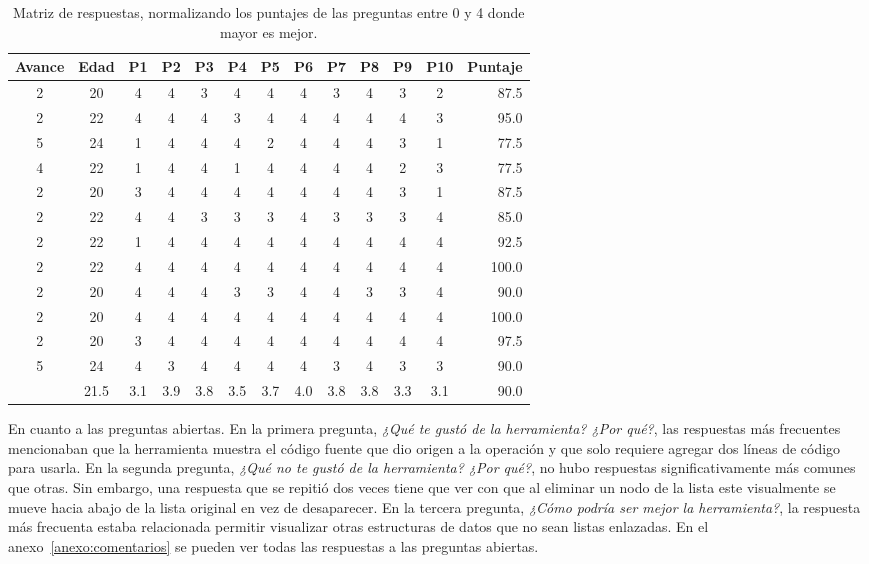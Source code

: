 \begin{table}[hbt]
    \caption[Matriz de respuestas]{Matriz de respuestas, normalizando los puntajes de las preguntas entre 0 y 4 donde mayor es mejor.}
    \label{tab:respuestas}
    \centering
    \begin{tabular}{@{}ccccccccccccr@{}}
    \toprule
    Avance & Edad & P1  & P2  & P3  & P4  & P5  & P6  & P7  & P8  & P9  & P10 & Puntaje \\ \midrule
    2      & 20   & 4   & 4   & 3   & 4   & 4   & 4   & 3   & 4   & 3   & 2   & 87.5    \\
    2      & 22   & 4   & 4   & 4   & 3   & 4   & 4   & 4   & 4   & 4   & 3   & 95.0    \\
    5      & 24   & 1   & 4   & 4   & 4   & 2   & 4   & 4   & 4   & 3   & 1   & 77.5    \\
    4      & 22   & 1   & 4   & 4   & 1   & 4   & 4   & 4   & 4   & 2   & 3   & 77.5    \\
    2      & 20   & 3   & 4   & 4   & 4   & 4   & 4   & 4   & 4   & 3   & 1   & 87.5    \\
    2      & 22   & 4   & 4   & 3   & 3   & 3   & 4   & 3   & 3   & 3   & 4   & 85.0    \\
    2      & 22   & 1   & 4   & 4   & 4   & 4   & 4   & 4   & 4   & 4   & 4   & 92.5    \\
    2      & 22   & 4   & 4   & 4   & 4   & 4   & 4   & 4   & 4   & 4   & 4   & 100.0   \\
    2      & 20   & 4   & 4   & 4   & 3   & 3   & 4   & 4   & 3   & 3   & 4   & 90.0    \\
    2      & 20   & 4   & 4   & 4   & 4   & 4   & 4   & 4   & 4   & 4   & 4   & 100.0   \\
    2      & 20   & 3   & 4   & 4   & 4   & 4   & 4   & 4   & 4   & 4   & 4   & 97.5    \\
    5      & 24   & 4   & 3   & 4   & 4   & 4   & 4   & 3   & 4   & 3   & 3   & 90.0    \\ \addlinespace[5pt]
    2.7    & 21.5 & 3.1 & 3.9 & 3.8 & 3.5 & 3.7 & 4.0 & 3.8 & 3.8 & 3.3 & 3.1 & 90.0    \\ \bottomrule
    \end{tabular}
\end{table}

En cuanto a las preguntas abiertas. En la primera pregunta, \textit{¿Qué te gustó de la herramienta? ¿Por qué?}, las respuestas más frecuentes mencionaban que la herramienta muestra el código fuente que dio origen a la operación y que solo requiere agregar dos líneas de código para usarla. En la segunda pregunta, \textit{¿Qué no te gustó de la herramienta? ¿Por qué?}, no hubo respuestas significativamente más comunes que otras. Sin embargo, una respuesta que se repitió dos veces tiene que ver con que al eliminar un nodo de la lista este visualmente se mueve hacia abajo de la lista original en vez de desaparecer. En la tercera pregunta, \textit{¿Cómo podría ser mejor la herramienta?}, la respuesta más frecuenta estaba relacionada permitir visualizar otras estructuras de datos que no sean listas enlazadas. En el anexo~\ref{anexo:comentarios} se pueden ver todas las respuestas a las preguntas abiertas.

